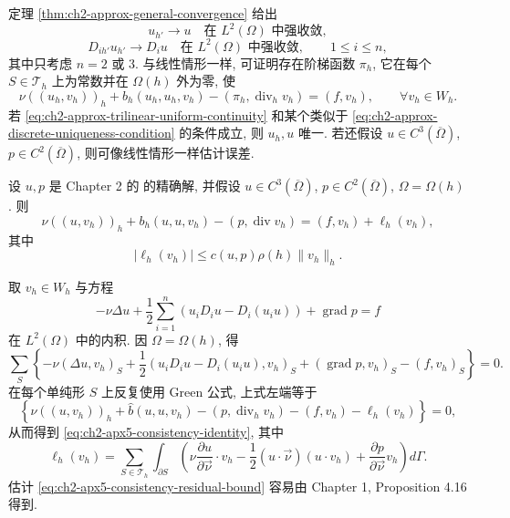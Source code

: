 定理 \ref{thm:ch2-approx-general-convergence} 给出
\begin{equation}
u_{h'}\longrightarrow u\quad\text{在 }L^2(\Omega)\text{ 中强收敛},
\label{eq:ch2-apx5-solution-strong-l2}
\end{equation}
\begin{equation}
D_{ih'}u_{h'}\longrightarrow D_iu
\quad\text{在 }L^2(\Omega)\text{ 中强收敛},
\qquad1\leq i\leq n,
\label{eq:ch2-apx5-solution-strong-derivatives}
\end{equation}
其中只考虑 $n=2$ 或 $3$. 与线性情形一样, 可证明存在阶梯函数 $\pi_h$, 它在每个 $S\in\mathcal T_h$ 上为常数并在 $\Omega(h)$ 外为零, 使
\begin{equation}
\nu((u_h,v_h))_h+b_h(u_h,u_h,v_h)
-(\pi_h,\operatorname{div}_hv_h)=(f,v_h),
\qquad\forall v_h\in W_h.
\label{eq:ch2-apx5-discrete-pressure-equation}
\end{equation}
若 \eqref{eq:ch2-approx-trilinear-uniform-continuity} 和某个类似于 \eqref{eq:ch2-approx-discrete-uniqueness-condition} 的条件成立, 则 $u_h,u$ 唯一. 若还假设 $u\in C^3(\overline\Omega)$, $p\in C^2(\overline\Omega)$, 则可像线性情形一样估计误差.

\begin{Lemma}
\label{lem:ch2-apx5-consistency-residual}
设 $u,p$ 是 Chapter 2 的  的精确解, 并假设 $u\in C^3(\overline\Omega)$, $p\in C^2(\overline\Omega)$, $\Omega=\Omega(h)$. 则
\begin{equation}
\nu((u,v_h))_h+b_h(u,u,v_h)-(p,\operatorname{div}v_h)
=(f,v_h)+\ell_h(v_h),
\label{eq:ch2-apx5-consistency-identity}
\end{equation}
其中
\begin{equation}
|\ell_h(v_h)|\leq c(u,p)\rho(h)\lVert v_h\rVert_h.
\label{eq:ch2-apx5-consistency-residual-bound}
\end{equation}
\end{Lemma}

\begin{Proof}
取 $v_h\in W_h$ 与方程
\[
-\nu\Delta u+\frac12\sum_{i=1}^{n}(u_iD_iu-D_i(u_iu))+\operatorname{grad}p=f
\]
在 $L^2(\Omega)$ 中的内积. 因 $\Omega=\Omega(h)$, 得
\[
\sum_S\left\{-\nu(\Delta u,v_h)_S
+\frac12(u_iD_iu-D_i(u_iu),v_h)_S
+(\operatorname{grad}p,v_h)_S-(f,v_h)_S\right\}=0.
\]
在每个单纯形 $S$ 上反复使用 Green 公式, 上式左端等于
\[
\left\{\nu((u,v_h))_h+\widehat b(u,u,v_h)
-(p,\operatorname{div}_hv_h)-(f,v_h)-\ell_h(v_h)\right\}=0,
\]
从而得到 \eqref{eq:ch2-apx5-consistency-identity}, 其中
\[
\ell_h(v_h)=\sum_{S\in\mathcal T_h}
\int_{\partial S}
\left(\nu\frac{\partial u}{\partial\vec\nu}\cdot v_h
-\frac12(u\cdot\vec\nu)(u\cdot v_h)
+\frac{\partial p}{\partial\vec\nu}v_h\right)d\Gamma.
\]
估计 \eqref{eq:ch2-apx5-consistency-residual-bound} 容易由 Chapter 1, Proposition 4.16 得到.
\end{Proof}

